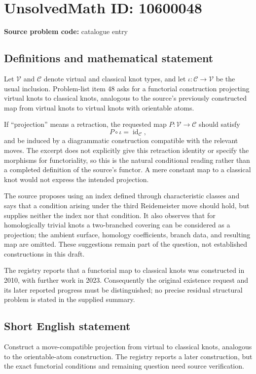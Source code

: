 \documentclass[11pt]{article}
\begin{document}
\section*{UnsolvedMath ID: 10600048}
\textbf{Source problem code:} catalogue entry
\subsection{Definitions and mathematical statement}
Let $\mathcal V$ and $\mathcal C$ denote virtual and classical knot types, and let $\iota:\mathcal C\to\mathcal V$ be the usual inclusion. Problem-list item 48 asks for a functorial construction projecting virtual knots to classical knots, analogous to the source's previously constructed map from virtual knots to virtual knots with orientable atoms.

If ``projection'' means a retraction, the requested map $P:\mathcal V\to\mathcal C$ should satisfy
\[
 P\circ\iota=\operatorname{id}_{\mathcal C},
\]
and be induced by a diagrammatic construction compatible with the relevant moves. The excerpt does not explicitly give this retraction identity or specify the morphisms for functoriality, so this is the natural conditional reading rather than a completed definition of the source's functor. A mere constant map to a classical knot would not express the intended projection.

The source proposes using an index defined through characteristic classes and says that a condition arising under the third Reidemeister move should hold, but supplies neither the index nor that condition. It also observes that for homologically trivial knots a two-branched covering can be considered as a projection; the ambient surface, homology coefficients, branch data, and resulting map are omitted. These suggestions remain part of the question, not established constructions in this draft.

The registry reports that a functorial map to classical knots was constructed in 2010, with further work in 2023. Consequently the original existence request and its later reported progress must be distinguished; no precise residual structural problem is stated in the supplied summary.
\subsection{Short English statement}
Construct a move-compatible projection from virtual to classical knots, analogous to the orientable-atom construction. The registry reports a later construction, but the exact functorial conditions and remaining question need source verification.
\end{document}
